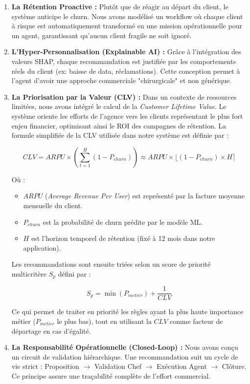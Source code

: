\begin{enumerate}
    \item \textbf{La Rétention Proactive :} Plutôt que de réagir au départ du client, le système anticipe le churn. Nous avons modélisé un workflow où chaque client à risque est automatiquement transformé en une mission opérationnelle pour un agent, garantissant qu'aucun client fragile ne soit ignoré.
    
    \item \textbf{L'Hyper-Personnalisation (Explainable AI) :} Grâce à l'intégration des valeurs SHAP, chaque recommandation est justifiée par les comportements réels du client (ex: baisse de data, réclamations). Cette conception permet à l'agent d'avoir une approche commerciale "chirurgicale" et non générique.
    
    \item \textbf{La Priorisation par la Valeur (CLV) :} Dans un contexte de ressources limitées, nous avons intégré le calcul de la \textit{Customer Lifetime Value}. Le système oriente les efforts de l'agence vers les clients représentant le plus fort enjeu financier, optimisant ainsi le ROI des campagnes de rétention. La formule simplifiée de la CLV utilisée dans notre système est définie par :
    
    \begin{equation}
        CLV = ARPU \times \left( \sum_{t=1}^{H} (1 - P_{churn}) \right) \approx ARPU \times \lfloor (1 - P_{churn}) \times H \rceil
    \end{equation}
    
    Où :
    \begin{itemize}
        \item $ARPU$ (\textit{Average Revenue Per User}) est représenté par la facture moyenne mensuelle du client.
        \item $P_{churn}$ est la probabilité de churn prédite par le modèle ML.
        \item $H$ est l'horizon temporel de rétention (fixé à 12 mois dans notre application).
    \end{itemize}
    
    Les recommandations sont ensuite triées selon un score de priorité multicritère $S_{p}$ défini par :
    
    \begin{equation}
        S_{p} = \min(P_{metier}) + \frac{1}{CLV}
    \end{equation}
    
    Ce qui permet de traiter en priorité les règles ayant la plus haute importance métier ($P_{metier}$ le plus bas), tout en utilisant la $CLV$ comme facteur de départage en cas d'égalité.
    
    \item \textbf{La Responsabilité Opérationnelle (Closed-Loop) :} Nous avons conçu un circuit de validation hiérarchique. Une recommandation suit un cycle de vie strict : Proposition $\rightarrow$ Validation Chef $\rightarrow$ Exécution Agent $\rightarrow$ Clôture. Ce principe assure une traçabilité complète de l'effort commercial.
\end{enumerate}

